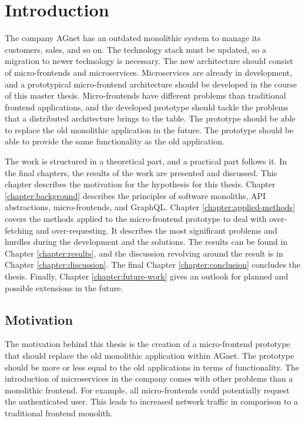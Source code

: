 \chapter{Introduction}\label{chapter:introduction}

The company AGnet has an outdated monolithic system to manage its customers, sales, and so on. The technology stack must be updated, so a migration to newer technology is necessary. The new architecture should consist of micro-frontends and microservices. Microservices are already in development, and a prototypical micro-frontend architecture should be developed in the course of this master thesis. Micro-frontends have different problems than traditional frontend applications, and the developed prototype should tackle the problems that a distributed architecture brings to the table. The prototype should be able to replace the old monolithic application in the future. The prototype should be able to provide the same functionality as the old application.

\bigskip

\noindent The work is structured in a theoretical part, and a practical part follows it. In the final chapters, the results of the work are presented and discussed. This chapter describes the motivation for the hypothesis for this thesis. Chapter \ref{chapter:background} describes the principles of software monoliths, \ac{API} abstractions, micro-frontends, and GraphQL. Chapter \ref{chapter:applied-methods} covers the methods applied to the micro-frontend prototype to deal with over-fetching and over-requesting. It describes the most significant problems and hurdles during the development and the solutions. The results can be found in Chapter \ref{chapter:results}, and the discussion revolving around the result is in Chapter \ref{chapter:discussion}. The final Chapter \ref{chapter:conclusion} concludes the thesis. 
Finally, Chapter \ref{chapter:future-work} gives an outlook for planned and possible extensions in the future.

\section{Motivation}\label{section:introduction:motivation}

The motivation behind this thesis is the creation of a micro-frontend prototype that should replace the old monolithic application within AGnet. The prototype should be more or less equal to the old applications in terms of functionality. The introduction of microservices in the company comes with other problems than a monolithic frontend. For example, all micro-frontends could potentially request the authenticated user. This leads to increased network traffic in comparison to a traditional frontend monolith.

